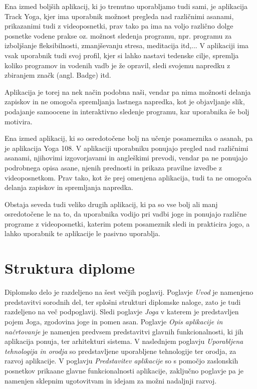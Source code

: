 \documentclass[a4paper, 12pt]{book}
\begin{document}
Ena izmed boljših aplikacij, ki jo trenutno uporabljamo tudi sami, je aplikacija Track Yoga, kjer ima uporabnik možnost pregleda nad različnimi asanami, prikazanimi tudi z videoposnetki, prav tako pa ima na voljo različno dolge posnetke vodene prakse oz. možnost sledenja programu, npr. programu za izboljšanje fleksibilnosti, zmanjševanju stresa, meditacija itd,... V aplikaciji ima vsak uporabnik tudi svoj profil, kjer si lahko nastavi tedenske cilje, spremlja koliko programov in vodenih vadb je že opravil, sledi svojemu napredku z zbiranjem značk (angl. Badge) itd. 

Aplikacija je torej na nek način podobna naši, vendar pa nima možnosti delanja zapiskov in ne omogoča spremljanja lastnega napredka, kot je objavljanje slik, podajanje samoocene in interaktivno sledenje programu, kar uporabnika še bolj motivira.

Ena izmed aplikacij, ki so osredotočene bolj na učenje posameznika o asanah, pa je aplikacija Yoga 108. V aplikaciji uporabniku ponujajo pregled nad različnimi asanami, njihovimi izgovorjavami in angleškimi prevodi, vendar pa ne ponujajo podrobnega opisa asane, njenih prednosti in prikaza pravilne izvedbe z videoposnetkom. 
Prav tako, kot že prej omenjena aplikacija, tudi ta ne omogoča delanja zapiskov in spremljanja napredka.

Obstaja seveda tudi veliko drugih aplikacij, ki pa so vse bolj ali manj osredotočene le na to, da uporabnika vodijo pri vadbi joge in ponujajo različne programe z videoposnetki, katerim potem posameznik sledi in prakticira jogo, a lahko uporabnik te aplikacije le pasivno uporablja.

\section{Struktura diplome}
Diplomsko delo je razdeljeno na šest večjih poglavij. Poglavje \textit{Uvod} je namenjeno predstavitvi sorodnih del, ter splošni strukturi diplomske naloge, zato je tudi razdeljeno na več podpoglavij. Sledi poglavje \textit{Joga} v katerem je predstavljen pojem Joga, zgodovina joge in pomen asan. Poglavje \textit{Opis aplikacije in načrtovanje} je namenjen predvsem predstavitvi glavnih funkcionalnosti, ki jih aplikacija ponuja, ter arhitekturi sistema. V naslednjem poglavju \textit{Uporabljena tehnologija in orodja} so predstavljene uporabljene tehnologije ter orodja, za razvoj aplikacije. V poglavju \textit{Predstavitev aplikacije} so s pomočjo zaslonskih posnetkov prikaane glavne funkcionalnosti aplikacije, zaključno poglavje pa je namenjen sklepnim ugotovitvam in idejam za možni nadaljnji razvoj.
\end{document}
